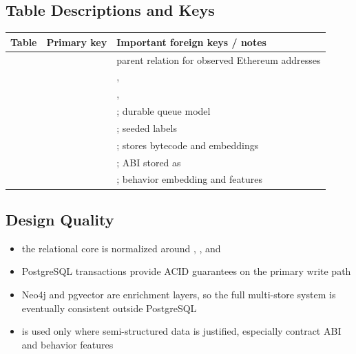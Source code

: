\documentclass[11pt,a4paper]{article}
\begin{document}
\subsection{Table Descriptions and Keys}

\begin{tabularx}{\textwidth}{@{}p{}p{}Y@{}}
\toprule
\textbf{Table} & \textbf{Primary key} & \textbf{Important foreign keys / notes} \\
\midrule
{} &  & parent relation for observed Ethereum addresses \\
 &  & ,  \\
 &  & ,  \\
 &  & ; durable queue model \\
 &  & ; seeded labels \\
 &  & ; stores bytecode and embeddings \\
 &  & ; ABI stored as  \\
 &  & ; behavior embedding and features \\
\bottomrule
\end{tabularx}

\subsection{Design Quality}

\begin{itemize}
\item the relational core is normalized around , , and 
\item PostgreSQL transactions provide ACID guarantees on the primary write path
\item Neo4j and pgvector are enrichment layers, so the full multi-store system is eventually consistent outside PostgreSQL
\item {} is used only where semi-structured data is justified, especially contract ABI and behavior features
\end{itemize}
\end{document}
